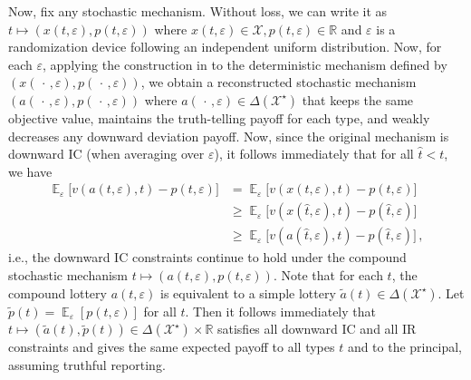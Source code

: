 \documentclass[12pt,letterpaper]{article}
\newenvironment{original}{\color{black}\noindent}{}
\theoremstyle{plain}
\theoremstyle{definition}
\theoremstyle{remark}
\DeclareMathOperator{\E}{\mathds{E}}
\newcommand{\R}{\mathds{R}}
\renewcommand{\1}{\mathds{1}}
\newcommand{\X}{\mathcal{X}}
\theoremstyle{definition}
\begin{document}
\begin{original}
Now, fix any stochastic mechanism. Without loss, we can write it as $t \mapsto (x(t, \varepsilon), p(t, \varepsilon))$ where $x(t, \varepsilon) \in \mathcal{X}, p(t, \varepsilon) \in \R$ and $\varepsilon$ is a randomization device following an independent uniform distribution. Now, for each $\varepsilon$, applying the construction in  to the deterministic mechanism defined by $(x(\,\cdot\,, \varepsilon), p(\,\cdot\,, \varepsilon))$, we obtain a reconstructed stochastic mechanism $(a(\,\cdot\,, \varepsilon), p(\,\cdot\,, \varepsilon))$ where $a(\,\cdot\,, \varepsilon) \in \Delta(\X^\star)$ that keeps the same objective value, maintains the truth-telling payoff for each type, and weakly decreases any downward deviation payoff. Now, since the original mechanism is downward IC (when averaging over $\varepsilon$), it follows immediately that for all $\hat{t} < t$, we have
\begin{align*}
    \E_{\varepsilon}\Big[v(a(t, \varepsilon), t) - p(t, \varepsilon)\Big] &= \E_{\varepsilon}\Big[v(x(t, \varepsilon), t) - p(t, \varepsilon)\Big]  \\
    &\geq \E_{\varepsilon}\Big[v(x(\hat{t}, \varepsilon), t) - p(\hat{t}, \varepsilon)\Big]   \\
    &\geq \E_{\varepsilon}\Big[v(a(\hat{t}, \varepsilon), t) - p(\hat{t}, \varepsilon)\Big]\,,
\end{align*}
i.e., the downward IC constraints continue to hold under the compound stochastic mechanism $t \mapsto (a(t, \varepsilon), p(t, \varepsilon))$. Note that for each $t$, the compound lottery $a(t, \varepsilon)$ is equivalent to a simple lottery $\tilde{a}(t) \in \Delta(\X^\star)$. Let $\tilde{p}(t) = \E_\varepsilon[p(t, \varepsilon)]$ for all $t$. Then it follows immediately that $t \mapsto (\tilde{a}(t), \tilde{p}(t)) \in \Delta(\X^\star) \times \R$ satisfies all downward IC and all IR constraints and gives the same expected payoff to all types $t$ and to the principal, assuming truthful reporting.
\end{original}
\end{document}
